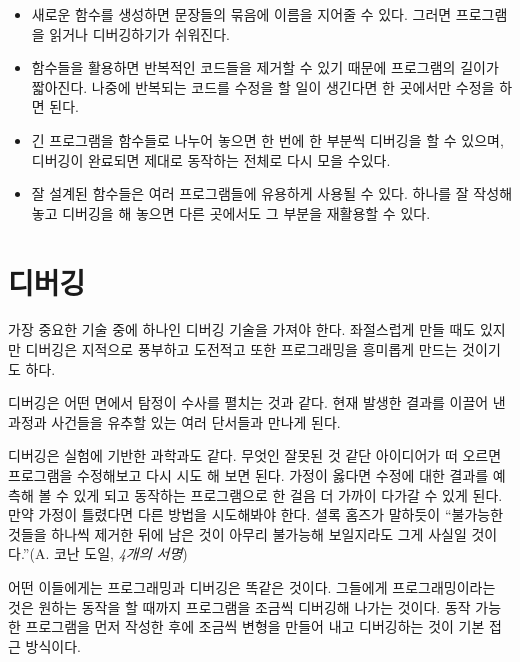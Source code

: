 \documentclass[10pt]{book}
\begin{document}
\begin{itemize}

\item 새로운 함수를 생성하면 문장들의 묶음에 이름을 지어줄 수 있다.
  그러면 프로그램을 읽거나 디버깅하기가 쉬워진다.

\item 함수들을 활용하면 반복적인 코드들을 제거할 수 있기 때문에
  프로그램의 길이가 짧아진다.  나중에 반복되는 코드를 수정을 할 일이
  생긴다면 한 곳에서만 수정을 하면 된다. 

\item 긴 프로그램을 함수들로 나누어 놓으면 한 번에 한 부분씩 디버깅을
  할 수 있으며, 디버깅이 완료되면 제대로 동작하는 전체로 다시 모을
  수있다.

\item 잘 설계된 함수들은 여러 프로그램들에 유용하게 사용될 수 있다.
  하나를 잘 작성해 놓고 디버깅을 해 놓으면 다른 곳에서도 그 부분을
  재활용할 수 있다.

\end{itemize}


\section{디버깅}

가장 중요한 기술 중에 하나인 디버깅 기술을 가져야 한다.  좌절스럽게
만들 때도 있지만 디버깅은 지적으로 풍부하고 도전적고 또한 프로그래밍을
흥미롭게 만드는 것이기도 하다.

디버깅은 어떤 면에서 탐정이 수사를 펼치는 것과 같다.  현재 발생한
결과를 이끌어 낸 과정과 사건들을 유추할 있는 여러 단서들과 만나게
된다.

디버깅은 실험에 기반한 과학과도 같다.  무엇인 잘못된 것 같단 아이디어가
떠 오르면 프로그램을 수정해보고 다시 시도 해 보면 된다.  가정이 옳다면
수정에 대한 결과를 예측해 볼 수 있게 되고 동작하는 프로그램으로 한 걸음
더 가까이 다가갈 수 있게 된다.  만약 가정이 틀렸다면 다른 방법을
시도해봐야 한다.  셜록 홈즈가 말하듯이 ``불가능한 것들을 하나씩 제거한 뒤에
남은 것이 아무리 불가능해 보일지라도 그게 사실일 것이다.''(A. 코난 도일,
{\em 4개의 서명})

어떤 이들에게는 프로그래밍과 디버깅은 똑같은 것이다.  그들에게
프로그래밍이라는 것은 원하는 동작을 할 때까지 프로그램을 조금씩
디버깅해 나가는 것이다.  동작 가능한 프로그램을 먼저 작성한 후에 조금씩
변형을 만들어 내고 디버깅하는 것이 기본 접근 방식이다. 
\end{document}
